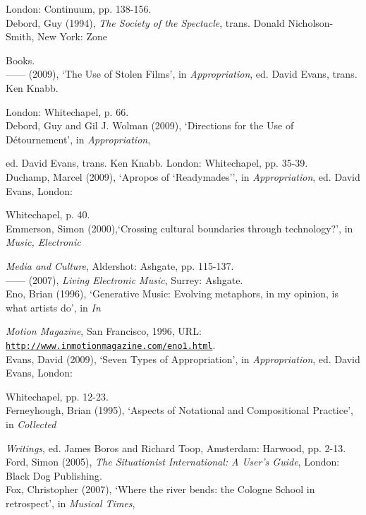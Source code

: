 London: Continuum, pp. 138-156.
\hypertarget{debord}{}\\
Debord, Guy (1994), \emph{The Society of the Spectacle}, trans. Donald Nicholson-Smith, New York: Zone 

Books.
\hypertarget{debord2}{}\\
------ (2009), `The Use of Stolen Films', in \emph{Appropriation}, ed. David Evans, trans. Ken Knabb. 

London: Whitechapel, p. 66.
\hypertarget{debord3}{}\\
Debord, Guy and Gil J. Wolman (2009), `Directions for the Use of D\'{e}tournement', in \emph{Appropriation}, 

ed. David Evans, trans. Ken Knabb. London: Whitechapel, pp. 35-39.
\hypertarget{duchamp}{}\\
Duchamp, Marcel (2009), `Apropos of `Readymades'', in \emph{Appropriation}, ed. David Evans, London: 

Whitechapel, p. 40.
\hypertarget{emmersoncross}{}\\
Emmerson, Simon (2000),`Crossing cultural boundaries through technology?',  in \emph{Music, Electronic}

\emph{Media and Culture}, Aldershot: Ashgate, pp. 115-137. 
\hypertarget{emmersonliving}{}\\
------ (2007), \emph{Living Electronic Music}, Surrey: Ashgate. 
\hypertarget{eno}{}\\
Eno, Brian (1996), `Generative Music: Evolving metaphors, in my opinion, is what artists do', in \emph{In}

\emph{Motion Magazine}, San Francisco, 1996, URL: \href{http://www.inmotionmagazine.com/eno1.html}{\texttt {http://www.inmotionmagazine.com/eno1.html}}.
\hypertarget{evans}{}\\
Evans, David (2009), `Seven Types of Appropriation', in \emph{Appropriation}, ed. David Evans, London: 

Whitechapel, pp. 12-23.
\hypertarget{ferneyhough}{}\\
Ferneyhough, Brian (1995), `Aspects of Notational and Compositional Practice', in \emph{Collected}

\emph{Writings}, ed. James Boros and Richard Toop, Amsterdam: Harwood, pp. 2-13.
\hypertarget{ford}{}\\
Ford, Simon (2005), \emph{The Situationist International: A User's Guide}, London: Black Dog Publishing.
\hypertarget{fox}{}\\
Fox, Christopher (2007), `Where the river bends: the Cologne School in retrospect', in  \emph{Musical Times}, 

